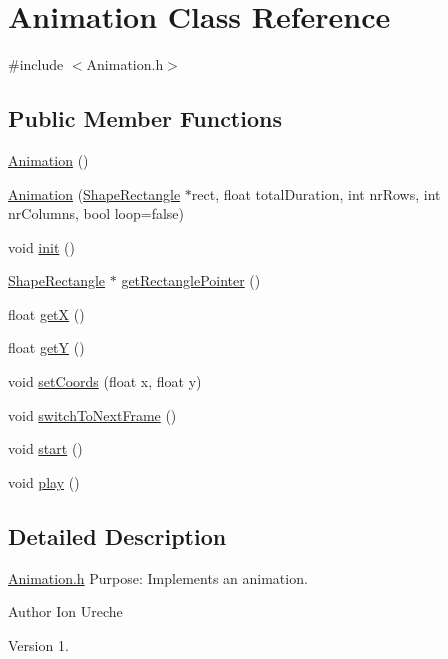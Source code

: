 \hypertarget{class_animation}{}\section{Animation Class Reference}
\label{class_animation}


{\ttfamily \#include $<$Animation.\+h$>$}

\subsection*{Public Member Functions}
\begin{DoxyCompactItemize}
\item 
\hyperlink{class_animation_a83f0a16cef7117f187ad596de38dd9d6}{Animation} ()
\item 
\hyperlink{class_animation_afd60356af2b0ce2af2fd09142b4ff43a}{Animation} (\hyperlink{class_shape_rectangle}{Shape\+Rectangle} $\ast$rect, float total\+Duration, int nr\+Rows, int nr\+Columns, bool loop=false)
\item 
void \hyperlink{class_animation_a71cd77a66064b85cb34061b47c414709}{init} ()
\item 
\hyperlink{class_shape_rectangle}{Shape\+Rectangle} $\ast$ \hyperlink{class_animation_a567a1028c3758bab197cb49a1f5ff34e}{get\+Rectangle\+Pointer} ()
\item 
float \hyperlink{class_animation_a4a67ae8f77cd8383ee15702666f5d236}{get\+X} ()
\item 
float \hyperlink{class_animation_a000f6837c55e7db24b6c51f0f29dab17}{get\+Y} ()
\item 
void \hyperlink{class_animation_a781079ce6fe72123d826633325da1f21}{set\+Coords} (float x, float y)
\item 
void \hyperlink{class_animation_aaee3c4db55fb03fa73e6a7e5ee5fb847}{switch\+To\+Next\+Frame} ()
\item 
void \hyperlink{class_animation_a96ee98c1649134ad383610dbc9def5fe}{start} ()
\item 
void \hyperlink{class_animation_aaa628f424f1cdaf2a74f8d10298ef8af}{play} ()
\end{DoxyCompactItemize}


\subsection{Detailed Description}
\hyperlink{_animation_8h_source}{Animation.\+h} Purpose\+: Implements an animation.

\begin{DoxyAuthor}{Author}
Ion Ureche 
\end{DoxyAuthor}
\begin{DoxyVersion}{Version}
1. 
\end{DoxyVersion}


